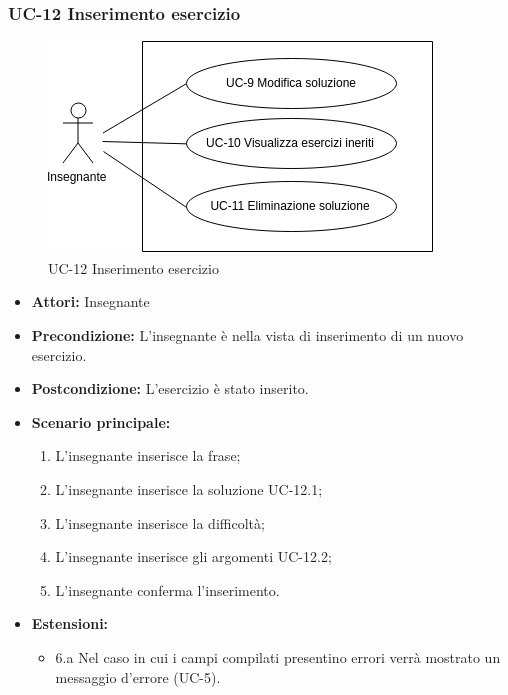 \subsubsection{UC-12 Inserimento esercizio}
\begin{figure}[h]
			\centering
			\includegraphics[scale=0.7]{images/UC-9.png}
			\caption{UC-12 Inserimento esercizio}
		\end{figure}
	\begin{itemize}
		\item \textbf{Attori: }Insegnante
		\item \textbf{Precondizione: }L'insegnante è nella vista di inserimento di un nuovo esercizio.
		\item \textbf{Postcondizione: }L'esercizio è stato inserito.
		\item \textbf{Scenario principale: }
		\begin{enumerate} 
		\item L'insegnante inserisce la frase;
		\item L'insegnante inserisce la soluzione UC-12.1;
		\item L'insegnante inserisce la difficoltà;
		\item L'insegnante inserisce gli argomenti UC-12.2;
		\item L'insegnante conferma l'inserimento.
		\end{enumerate}
		\item \textbf{Estensioni: }
		\begin{itemize}
		\item 6.a Nel caso in cui i campi compilati presentino errori verrà mostrato un messaggio d'errore (UC-5).
		\end{itemize}
	\end{itemize}

